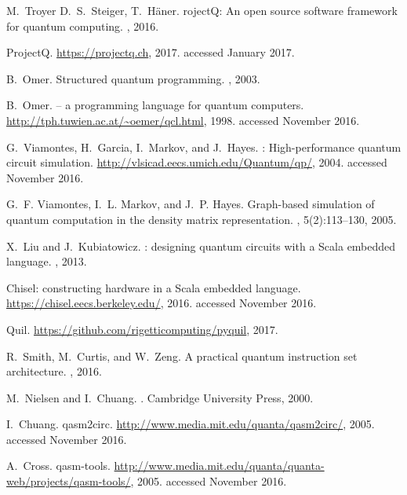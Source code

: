 \documentclass[USenglish,12pt,fleqn]{article} %
\begin{document}
\begin{thebibliography}{10}
M.~Troyer D.~S.~Steiger, T.~H\"aner.
roject{Q}: An open source software framework for quantum
  computing.
, 2016.

{P}roject{Q}.
\newblock \url{https://projectq.ch}, 2017.
\newblock accessed January 2017.

B.~Omer.
\newblock Structured quantum programming.
, 2003.

B.~Omer.
 -- a programming language for quantum computers.
\newblock \url{http://tph.tuwien.ac.at/~oemer/qcl.html}, 1998.
\newblock accessed November 2016.

G.~Viamontes, H.~Garcia, I.~Markov, and J.~Hayes.
: High-performance quantum circuit simulation.
\newblock \url{http://vlsicad.eecs.umich.edu/Quantum/qp/}, 2004.
\newblock accessed November 2016.

G.~F. Viamontes, I.~L. Markov, and J.~P. Hayes.
\newblock Graph-based simulation of quantum computation in the density matrix
  representation.
, 5(2):113--130, 2005.

X.~Liu and J.~Kubiatowicz.
: designing quantum circuits with a {S}cala embedded
  language.
,
  2013.

Chisel: constructing hardware in a {S}cala embedded language.
\newblock \url{https://chisel.eecs.berkeley.edu/}, 2016.
\newblock accessed November 2016.

Quil.
\newblock \url{https://github.com/rigetticomputing/pyquil}, 2017.

R.~Smith, M.~Curtis, and W.~Zeng.
\newblock A practical quantum instruction set architecture.
, 2016.

M.~Nielsen and I.~Chuang.
.
\newblock Cambridge University Press, 2000.

I.~Chuang.
\newblock qasm2circ.
\newblock \url{http://www.media.mit.edu/quanta/qasm2circ/}, 2005.
\newblock accessed November 2016.

A.~Cross.
\newblock qasm-tools.
\newblock
  \url{http://www.media.mit.edu/quanta/quanta-web/projects/qasm-tools/}, 2005.
\newblock accessed November 2016.


\end{thebibliography}
\end{document}
